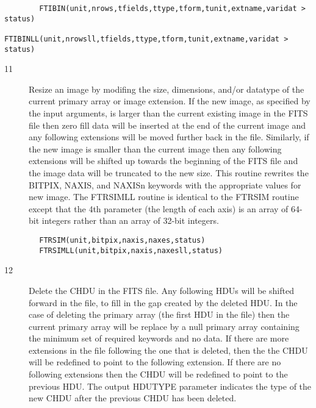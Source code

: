 \documentclass[11pt]{book}
\begin{document}
\begin{verbatim}
        FTIBIN(unit,nrows,tfields,ttype,tform,tunit,extname,varidat > status)
        FTIBINLL(unit,nrowsll,tfields,ttype,tform,tunit,extname,varidat > status)

\end{verbatim}


\begin{description}
\item[11]  Resize an image by modifing the size, dimensions, and/or datatype of the
    current primary array or image extension. If the new image, as specified
    by the input arguments, is larger than the current existing image
    in the FITS file then zero fill data will be inserted at the end
    of the current image and any following extensions will be moved
    further back in the file.  Similarly, if the new image is
    smaller than the current image then any following extensions
    will be shifted up towards the beginning of the FITS file
    and the image data will be truncated to the new size.
    This routine rewrites the BITPIX, NAXIS, and NAXISn keywords
    with the appropriate values for new image. The FTRSIMLL routine is identical
    to the FTRSIM routine except that the 4th parameter (the length
    of each axis) is an array of 64-bit integers rather than an array
   of 32-bit integers.
\end{description}

\begin{verbatim}
        FTRSIM(unit,bitpix,naxis,naxes,status)
        FTRSIMLL(unit,bitpix,naxis,naxesll,status)
\end{verbatim}

\begin{description}
\item[12] Delete the CHDU in the FITS file.  Any following HDUs will be shifted
    forward in the file, to fill in the gap created by the deleted
    HDU.  In the case of deleting the primary array (the first HDU in
    the file) then the current primary array will be replace by a null
    primary array containing the minimum set of required keywords and
    no data.  If there are more extensions in the file following the
    one that is deleted, then the the CHDU will be redefined to point
    to the following extension.  If there are no following extensions
    then the CHDU will be redefined to point to the previous HDU.  The
    output HDUTYPE parameter indicates the type of the new CHDU after
   the previous CHDU has been deleted.
\end{description}
\end{document}
